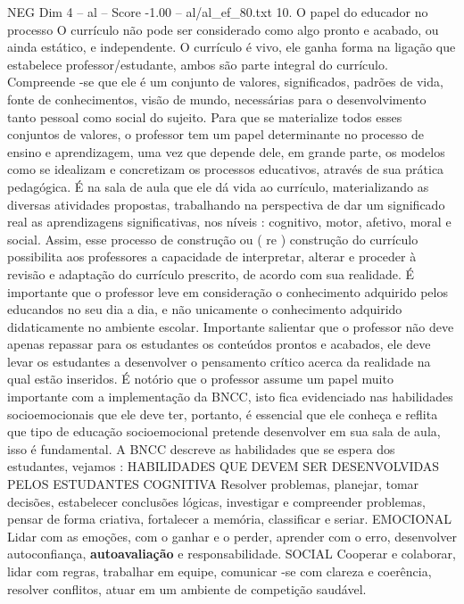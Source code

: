 \begin{textsample}{NEG Dim 4 – al – Score -1.00 – al/al\_ef\_80.txt}  \label{ex:f4_neg_244}
10.
O papel do educador no processo O currículo não pode ser considerado como algo pronto e acabado, ou ainda estático, e independente.
O currículo é vivo, ele ganha forma na ligação que estabelece professor/estudante, ambos são parte integral do currículo.
Compreende -se que ele é um conjunto de valores, significados, padrões de vida, fonte de conhecimentos, visão de mundo, necessárias para o desenvolvimento tanto pessoal como social do sujeito.
Para que se materialize todos esses conjuntos de valores, o professor tem um papel determinante no processo de ensino e aprendizagem, uma vez que depende dele, em grande parte, os modelos como se idealizam e concretizam os processos educativos, através de sua prática pedagógica.
É na sala de aula que ele dá vida ao currículo, materializando as diversas atividades propostas, trabalhando na perspectiva de dar um significado real as aprendizagens significativas, nos níveis : cognitivo, motor, afetivo, moral e social.
Assim, esse processo de construção ou ( re ) construção do currículo possibilita aos professores a capacidade de interpretar, alterar e proceder à revisão e adaptação do currículo prescrito, de acordo com sua realidade.
É importante que o professor leve em consideração o conhecimento adquirido pelos educandos no seu dia a dia, e não unicamente o conhecimento adquirido didaticamente no ambiente escolar.
Importante salientar que o professor não deve apenas repassar para os estudantes os conteúdos prontos e acabados, ele deve levar os estudantes a desenvolver o pensamento crítico acerca da realidade na qual estão inseridos.
É notório que o professor assume um papel muito importante com a implementação da BNCC, isto fica evidenciado nas habilidades socioemocionais que ele deve ter, portanto, é essencial que ele conheça e reflita que tipo de educação socioemocional pretende desenvolver em sua sala de aula, isso é fundamental.
A BNCC descreve as habilidades que se espera dos estudantes, vejamos : HABILIDADES QUE DEVEM SER DESENVOLVIDAS PELOS ESTUDANTES COGNITIVA Resolver problemas, planejar, tomar decisões, estabelecer conclusões lógicas, investigar e compreender problemas, pensar de forma criativa, fortalecer a memória, classificar e seriar.
EMOCIONAL Lidar com as emoções, com o ganhar e o perder, aprender com o erro, desenvolver autoconfiança, \textbf{autoavaliação} e responsabilidade.
SOCIAL Cooperar e colaborar, lidar com regras, trabalhar em equipe, comunicar -se com clareza e coerência, resolver conflitos, atuar em um ambiente de competição saudável.

\end{textsample}
